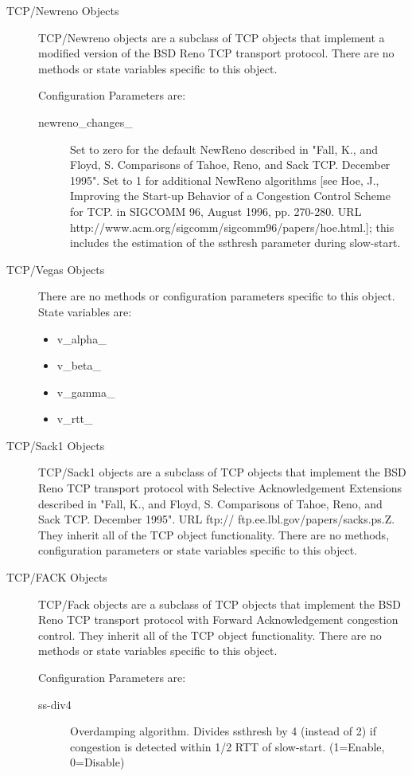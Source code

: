 \begin{description}
\item[TCP/Newreno Objects]
TCP/Newreno objects are a subclass of TCP objects that implement a
modified version of the BSD Reno TCP transport protocol. 
There are no methods or state variables specific to this object. 

Configuration Parameters are:
\begin{description}

\item[newreno\_changes\_]
Set to zero for the default NewReno described in "Fall, K., and Floyd, S.
Comparisons of Tahoe, Reno, and Sack TCP. December 1995". Set to 1 for
additional NewReno algorithms [see Hoe, J., Improving the Start-up
Behavior of a Congestion Control Scheme for TCP. in SIGCOMM 96, August
1996, pp. 270-280. URL 
http://www.acm.org/sigcomm/sigcomm96/papers/hoe.html.]; this includes the
estimation of the ssthresh parameter during slow-start. 
\end{description}


\item[TCP/Vegas Objects]
There are no methods or configuration parameters specific to this
object. State variables are:
\begin{itemize}
\item v\_alpha\_
\item v\_beta\_
\item v\_gamma\_
\item v\_rtt\_
\end{itemize}


\item[TCP/Sack1 Objects]
TCP/Sack1 objects are a subclass of TCP objects that implement the BSD
Reno TCP transport protocol with Selective Acknowledgement Extensions
described in "Fall, K., and Floyd, S. Comparisons of Tahoe, Reno, and
Sack TCP. December 1995". URL ftp:// ftp.ee.lbl.gov/papers/sacks.ps.Z. 
They inherit all of the TCP object functionality. There are no methods,
configuration parameters or state variables specific to this object. 


\item[TCP/FACK Objects]
TCP/Fack objects are a subclass of TCP objects that implement the BSD Reno
TCP transport protocol with Forward Acknowledgement congestion control. 
They inherit all of the TCP object functionality. There are no methods or
state variables specific to this object. 

Configuration Parameters are:
\begin{description}
\item[ss-div4]
Overdamping algorithm. Divides ssthresh by 4 (instead of 2) if congestion
is detected within 1/2 RTT of slow-start. (1=Enable, 0=Disable) 


\end{description}
\end{description}
